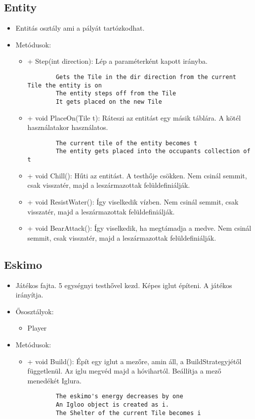 \subsection{Entity}
\begin{itemize}
	\item Entitás osztály ami a pályát tartózkodhat.
	\item Metódusok:
	\begin{itemize}
		\item + Step(int direction): Lép a paraméterként kapott irányba.
		\begin{lstlisting}
		Gets the Tile in the dir direction from the current Tile the entity is on
		The entity steps off from the Tile
		It gets placed on the new Tile
		\end{lstlisting}
		\item + void PlaceOn(Tile t): Ráteszi az entitást egy másik táblára. A kötél használatakor használatos.
		\begin{lstlisting}
		The current tile of the entity becomes t
		The entity gets placed into the occupants collection of t
		\end{lstlisting}
		\item + void Chill(): Hűti az entitást. A testhője csökken. Nem csinál semmit, csak visszatér, majd a leszármazottak felüldefiniálják.
		\item + void ResistWater(): Így viselkedik vízben. Nem csinál semmit, csak visszatér, majd a leszármazottak felüldefiniálják.
		\item + void BearAttack(): Így viselkedik, ha megtámadja a medve. Nem csinál semmit, csak visszatér, majd a leszármazottak felüldefiniálják.
	\end{itemize}
\end{itemize}

\subsection{Eskimo}
\begin{itemize}
	\item Játékos fajta. 5 egységnyi testhővel kezd. Képes iglut építeni. A játékos irányítja.
	\item Ősosztályok:
	\begin{itemize}
		\item Player
	\end{itemize}
	\item Metódusok:
	\begin{itemize}
		\item + void Build(): Épít egy iglut a mezőre, amin áll, a BuildStrategyjétől függetlenül. Az iglu megvéd majd a hóvihartól. Beállítja a mező menedékét Iglura.
		\begin{lstlisting}
		The eskimo's energy decreases by one
		An Igloo object is created as i.
		The Shelter of the current Tile becomes i
		\end{lstlisting}
	\end{itemize}
\end{itemize}

